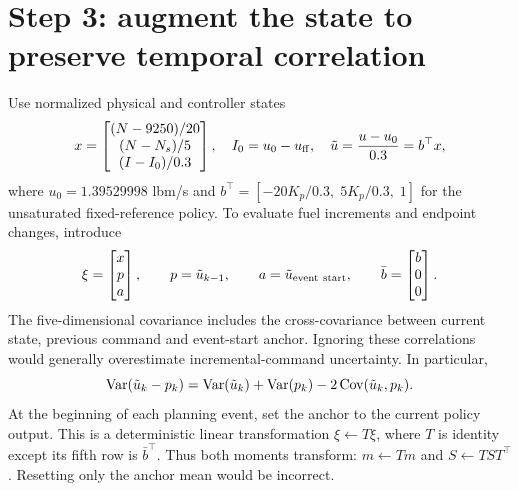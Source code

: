 \documentclass[11pt,a4paper]{article}
\begin{document}
\section{Step 3: augment the state to preserve temporal correlation}
Use normalized physical and controller states
\begin{equation}
x=\begin{bmatrix}(N-9250)/20\\(N-N_s)/5\\(I-I_0)/0.3\end{bmatrix},\quad
I_0=u_0-u_{\rm ff},\quad\tilde u=\frac{u-u_0}{0.3}=b^\top x,
\end{equation}
where $u_0=1.39529998$ lbm/s and $b^\top=[-20K_p/0.3,\;5K_p/0.3,\;1]$ for the unsaturated fixed-reference policy. To evaluate fuel increments and endpoint changes, introduce
\begin{equation}
\xi=\begin{bmatrix}x\\p\\a\end{bmatrix},\qquad p=\tilde u_{k-1},\qquad a=\tilde u_{\rm event\ start},\qquad
\bar b=\begin{bmatrix}b\\0\\0\end{bmatrix}.
\end{equation}
The five-dimensional covariance includes the cross-covariance between current state, previous command and event-start anchor. Ignoring these correlations would generally overestimate incremental-command uncertainty. In particular,
\begin{equation}
\operatorname{Var}(\tilde u_k-p_k)=\operatorname{Var}(\tilde u_k)+\operatorname{Var}(p_k)-2\operatorname{Cov}(\tilde u_k,p_k).
\end{equation}
At the beginning of each planning event, set the anchor to the current policy output. This is a deterministic linear transformation $\xi\leftarrow T\xi$, where $T$ is identity except its fifth row is $\bar b^\top$. Thus both moments transform: $m\leftarrow Tm$ and $S\leftarrow TST^\top$. Resetting only the anchor mean would be incorrect.
\end{document}
